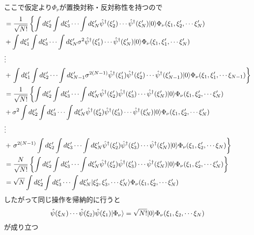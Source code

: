 \documentclass[dvipdfmx, 11pt, a4paper]{jsarticle}
\numberwithin{equation}{section}
\theoremstyle{definition}
\begin{document}
\begin{derivationBox}
\begin{align}
        \end{align}
        ここで仮定より$\Phi_\nu$が置換対称・反対称性を持つので
        \begin{align}
            &= \frac{1}{\sqrt{N!}}\left\{ \int d\xi_2' \int d\xi_3' \cdots \int d\xi_N'  \hat{\psi}^\dagger (\xi_2')\cdots \hat{\psi}^\dagger (\xi_N') |0\rangle  \Phi_\nu  (\xi_1,\xi_2',\cdots \xi_N') \right. \notag \\
            &+ \int d\xi_1' \int d\xi_3' \cdots \int d\xi_N' \sigma^2 \hat{\psi}^\dagger (\xi_1') \cdots \hat{\psi}^\dagger (\xi_N') |0\rangle  \Phi_\nu  (\xi_1,\xi_1',\cdots \xi_N')  \notag \\
            &\vdots \notag \\
            &+ \left. \int d\xi_1' \int d\xi_2' \cdots \int d\xi_{N-1}' \sigma^{2(N-1)} \hat{\psi}^\dagger (\xi_1') \hat{\psi}^\dagger (\xi_2')\cdots \hat{\psi}^\dagger (\xi_{N-1}') |0\rangle  \Phi_\nu  (\xi_1,\xi_1',\cdots \xi_{N-1}) \right\} \notag \\
            &= \frac{1}{\sqrt{N!}}\left\{ \int d\xi_2' \int d\xi_3' \cdots \int d\xi_N'  \hat{\psi}^\dagger (\xi_2') \hat{\psi}^\dagger (\xi_3') \cdots \hat{\psi}^\dagger (\xi_N') |0\rangle  \Phi_\nu  (\xi_1,\xi_2',\cdots \xi_N') \right. \notag \\
            &+ \sigma^2 \int d\xi_2' \int d\xi_3' \cdots \int d\xi_N'\hat{\psi}^\dagger (\xi_2') \hat{\psi}^\dagger (\xi_3') \cdots \hat{\psi}^\dagger (\xi_N') |0\rangle  \Phi_\nu  (\xi_1,\xi_2',\cdots \xi_N')  \notag \\
            &\vdots \notag \\
            &+ \left. \sigma^{2(N-1)} \int d\xi_2' \int d\xi_3' \cdots \int d\xi_{N}' \hat{\psi}^\dagger (\xi_2') \hat{\psi}^\dagger (\xi_3')\cdots \hat{\psi}^\dagger (\xi_{N}') |0\rangle  \Phi_\nu  (\xi_1,\xi_2',\cdots \xi_{N}) \right\} \notag \\
            &=  \frac{N}{\sqrt{N!}}\left\{ \int d\xi_2' \int d\xi_3' \cdots \int d\xi_N'  \hat{\psi}^\dagger (\xi_2') \hat{\psi}^\dagger (\xi_3') \cdots \hat{\psi}^\dagger (\xi_N') |0\rangle  \Phi_\nu  (\xi_1,\xi_2',\cdots \xi_N') \right\} \notag \\
            &= \sqrt{N} \int d\xi_2' \int d\xi_3' \cdots \int d\xi_N' |\xi_2',\xi_3',\cdots\xi_N' \rangle \Phi_\nu  (\xi_1,\xi_2',\cdots \xi_N') 
        \end{align}
        したがって同じ操作を帰納的に行うと
        \begin{align}
            \hat{\psi}(\xi_N)\cdots \hat{\psi}(\xi_2) \hat{\psi}(\xi_1) |\Phi_\nu \rangle = \sqrt{N!} |0 \rangle \Phi_\nu (\xi_1,\xi_2,\cdots \xi_N) \notag 
        \end{align}
        が成り立つ
    \end{derivationBox}
\end{document}
